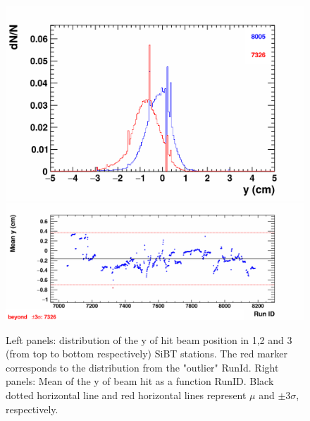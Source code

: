 \begin{figure}[H]
\begin{center}
            \includegraphics[width=0.35\linewidth]{../pict/QA_RunByRun_24.12/H1/nVtxTr_h2_RunId_beam_hit_y_st2.png}
            \includegraphics[width=0.60\linewidth]{../pict/QA_RunByRun_24.12/nVtxTr_h2_RunId_beam_hit_y_st2.png}

            \vspace{-3mm}
            \caption{Left panels: distribution of the y of hit beam position in 1,2 and 3 (from top to bottom respectively) SiBT stations. The red marker corresponds to the distribution from the "outlier" RunId. Right panels: Mean of the y of beam hit as a function RunID. Black dotted horizontal line and red horizontal lines represent $\mu$ and $\pm3\sigma$, respectively.}
            \label{fig:SiBT_y}
        \end{center}
        \vspace{-5mm}
    \end{figure}

